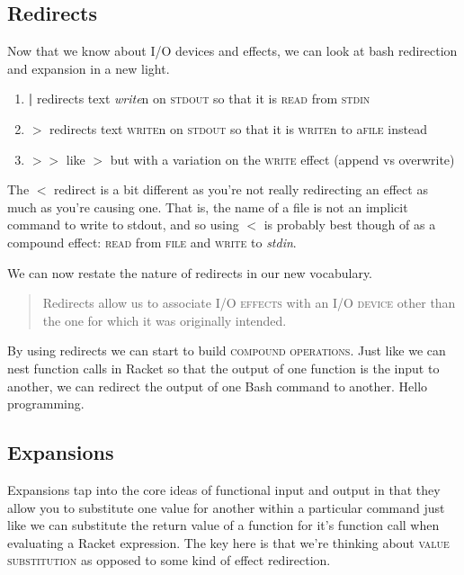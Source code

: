 \documentclass[]{tufte-handout}
\begin{document}
\subsection{Redirects}

Now that we know about \textsc{I/O} devices and effects, we can look at bash redirection and expansion in a new light. 
\begin{enumerate}
\item \textbf{|} redirects text \textit{write}n on \textsc{stdout} so that it is \textsc{read} from \textsc{stdin} \newline
\item \textbf{$>$} redirects text \textsc{write}n on \textsc{stdout} so that it is \textsc{write}n to a\textsc{file} instead
\item \textbf{$>>$} like \textit{$>$} but with a variation on the \textsc{write} effect (append vs overwrite)
\end{enumerate}
The \textbf{$<$} redirect is a bit different as you're not really redirecting an effect as much as you're causing one.  That is, the name of a file is not an implicit command to write to stdout, and so using $<$ is probably best though of as a compound effect: \textsc{read} from \textsc{file} and \textsc{write} to \textit{stdin}.

We can now restate the nature of redirects in our new vocabulary.
\begin{quote}
Redirects allow us to associate \textsc{I/O effects} with an \textsc{I/O device} other than the one for which it was originally intended.
\end{quote}
By using redirects we can start to build \textsc{compound operations}. Just like we can nest function calls in Racket so that the output of one function is the input to another, we can redirect the output of one Bash command to another. Hello programming.

\subsection{Expansions}

Expansions tap into the core ideas of functional input and output in that they allow you to substitute one value for another within a particular command just like we can substitute the return value of a function for it's function call when evaluating a Racket expression.  The key here is that we're thinking about \textsc{value substitution} as opposed to some kind of effect redirection. 
\end{document}

